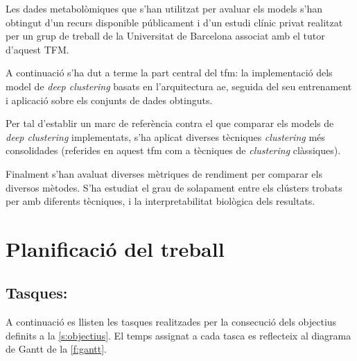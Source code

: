 \documentclass[CAT,BIB]{TFUOC}%
\begin{document}
        Les dades metabolòmiques que s’han utilitzat per avaluar els models
        s'han obtingut d'un recurs disponible públicament
        i d'un estudi clínic privat
        realitzat per un grup de treball de la Universitat de Barcelona
        associat amb el tutor d’aquest TFM.

        A continuació s'ha dut a terme la part central del \gls{tfm}:
        la implementació dels model de \textit{deep clustering}
        basats en l'arquitectura \gls{ae},
        seguida del seu entrenament i aplicació
        sobre els conjunts de dades obtinguts.

        Per tal d’establir un marc de referència
        contra el que comparar els models de \textit{deep clustering} implementats,
        s'ha aplicat diverses tècniques \textit{clustering} més consolidades
        (referides en aquest \gls{tfm} com a tècniques de \textit{clustering} clàssiques).

        Finalment s'han avaluat diverses mètriques de rendiment
        per comparar els diversos mètodes.
        S'ha estudiat el grau de solapament entre els clústers trobats per amb diferents tècniques,
        i la interpretabilitat biològica dels resultats.

    \section{Planificació del treball}
    \label{s:planificacio}

        \subsection{Tasques:}
        \label{s:tasques}

            A continuació es llisten les tasques realitzades
            per la consecució dels objectius definits a la \cref{s:objectius}.
            El temps assignat a cada tasca
            es reflecteix al diagrama de Gantt de la \cref{f:gantt}.
\end{document}

